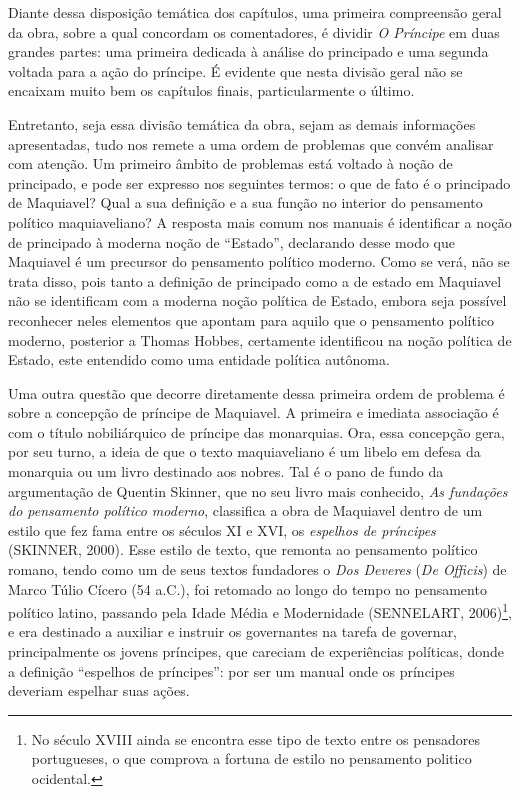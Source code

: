 Diante dessa disposição temática dos capítulos, uma primeira compreensão
geral da obra, sobre a qual concordam os comentadores, é dividir \emph{O
Príncipe} em duas grandes partes: uma primeira dedicada à análise do
principado e uma segunda voltada para a ação do príncipe. É evidente que
nesta divisão geral não se encaixam muito bem os capítulos finais,
particularmente o último.

Entretanto, seja essa divisão temática da obra, sejam as demais
informações apresentadas, tudo nos remete a uma ordem de problemas que
convém analisar com atenção. Um primeiro âmbito de problemas está
voltado à noção de principado, e pode ser expresso nos seguintes termos:
o que de fato é o principado de Maquiavel? Qual a sua definição e a sua
função no interior do pensamento político maquiaveliano? A resposta mais
comum nos manuais é identificar a noção de principado à moderna noção de
``Estado'', declarando desse modo que Maquiavel é um precursor do
pensamento político moderno. Como se verá, não se trata disso, pois
tanto a definição de principado como a de estado em Maquiavel não se
identificam com a moderna noção política de Estado, embora seja possível
reconhecer neles elementos que apontam para aquilo que o pensamento
político moderno, posterior a Thomas Hobbes, certamente identificou na
noção política de Estado, este entendido como uma entidade política
autônoma.

Uma outra questão que decorre diretamente dessa primeira ordem de
problema é sobre a concepção de príncipe de Maquiavel. A primeira e
imediata associação é com o título nobiliárquico de príncipe das
monarquias. Ora, essa concepção gera, por seu turno, a ideia de que o
texto maquiaveliano é um libelo em defesa da monarquia ou um livro
destinado aos nobres. Tal é o pano de fundo da argumentação de Quentin
Skinner, que no seu livro mais conhecido, \emph{As fundações do
pensamento político moderno}, classifica a obra de Maquiavel dentro de
um estilo que fez fama entre os séculos XI e XVI, os \emph{espelhos de
príncipes} (SKINNER, 2000). Esse estilo de texto, que remonta ao
pensamento político romano, tendo como um de seus textos fundadores o
\emph{Dos Deveres} (\emph{De Officis}) de Marco Túlio Cícero (54 a.C.),
foi retomado ao longo do tempo no pensamento político latino, passando
pela Idade Média e Modernidade (SENNELART, 2006)\footnote{No século
  XVIII ainda se encontra esse tipo de texto entre os pensadores
  portugueses, o que comprova a fortuna de estilo no pensamento politico
  ocidental.}, e era destinado a auxiliar e instruir os governantes na
tarefa de governar, principalmente os jovens príncipes, que careciam de
experiências políticas, donde a definição ``espelhos de príncipes'': por
ser um manual onde os príncipes deveriam espelhar suas ações.

